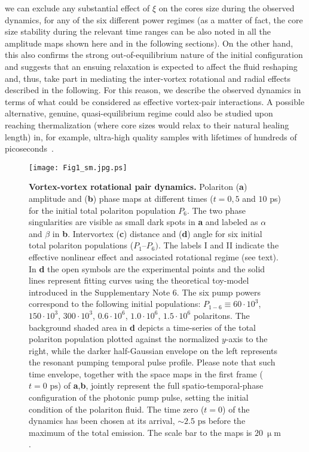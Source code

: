 \documentclass[aps,prb,twocolumn,superscriptaddress,nofootinbib]{revtex4}
\def\editr#1{#1}
\def\refer#1{#1}
\begin{document}
we can exclude any substantial effect of $\xi$ on the \refer{cores size during the} observed dynamics, 
for any of the six different power regimes
\refer{(as a matter of fact, the core size stability during the relevant time ranges
can be also noted in all the amplitude maps shown here and in the following sections).
On the other hand, this also confirms the strong out-of-equilibrium nature of the initial configuration
and suggests that an ensuing relaxation is expected to affect the fluid reshaping and, thus,
take part in mediating the inter-vortex rotational and radial effects described in the following.
For this reason, we describe the observed dynamics in terms of what could be considered
as effective vortex-pair interactions.
A possible alternative, genuine, quasi-equilibrium regime could also be studied upon reaching 
thermalization (where core sizes would relax to their natural healing length) in, for example,
ultra-high quality samples with lifetimes of hundreds of picoseconds~\cite{caputo_topological_2017}.}\\

\begin{figure}[htpb]
\centering
\texttt{[image: Fig1\_sm.jpg.ps]}
\caption{{\bf Vortex-vortex \refer{rotational pair} dynamics.}
%
Polariton (\textbf{a}) amplitude and (\textbf{b}) phase maps
at different times ($t = 0, 5$ and $10$ ps) for the initial total
polariton population $P_6$.
%
The two phase singularities are \editr{visible as small dark spots} in \textbf{a}
\editr{and labeled as $\alpha$ and $\beta$ in \textbf{b}}.
%
Intervortex (\textbf{c}) distance and (\textbf{d}) angle for six initial total
polariton populations ($P_{1}$--$P_{6})$.
%
\editr{The labels I and II
indicate the effective nonlinear effect and associated rotational regime (see text)}.
In \textbf{d} the open symbols are the experimental points and the solid lines represent fitting curves
using the theoretical toy-model introduced
in the \editr{Supplementary Note 6}.
%
The six pump powers correspond to the following initial
populations: $P_{1-6} \equiv 60\cdot 10^{3}$, $150\cdot 10^{3}$, $300\cdot 10^{3}$,
$0.6\cdot 10^{6}$, $1.0\cdot 10^{6}$, $1.5\cdot 10^{6}$ polaritons.
%
The background shaded area in \textbf{d} depicts a time-series of
the total polariton population plotted against 
\editr{the normalized $y$-axis to the right,
while the darker half-Gaussian envelope on the left represents the resonant pumping
temporal pulse profile.
\refer{Please note that such time envelope, together with 
the space maps in the first frame ($t=0\text{ ps}$) of \textbf{a},\textbf{b},
jointly represent the full spatio-temporal-phase configuration of the photonic pump pulse,
setting the initial condition of the polariton fluid.}
The time zero ($t=0$) of the dynamics has been chosen at its arrival,
$\sim 2.5 \text{ ps}$ before the maximum of the total emission.
The scale bar to the maps is $20~\upmu\text{m}$.}
}
\label{fig:FIG1}
\end{figure}
\end{document}
